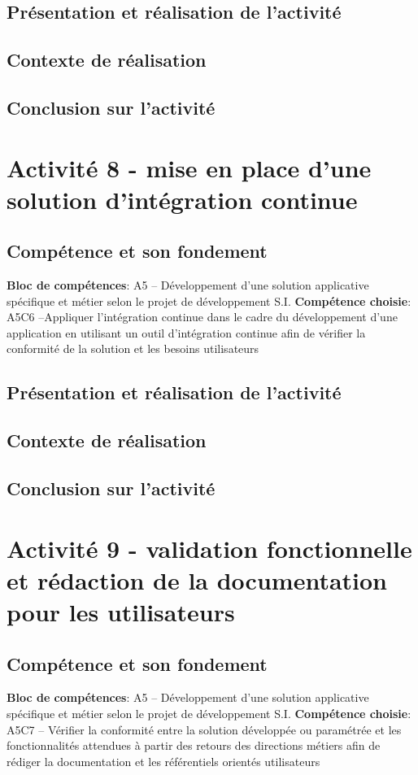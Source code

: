 \documentclass[a4paper, 11pt]{report}
\begin{document}
\subsection{Présentation et réalisation de l'activité}
\subsection{Contexte de réalisation}
\subsection{Conclusion sur l'activité}

\section{Activité 8 - mise en place d’une solution d’intégration continue}
\subsection{Compétence et son fondement}
\textbf{Bloc de compétences}: A5 – Développement d’une solution applicative spécifique et métier selon le projet de développement S.I.
\newline
\textbf{Compétence choisie}: A5C6 –Appliquer l’intégration continue dans le cadre du développement d’une application en utilisant un outil d’intégration continue afin de vérifier la conformité de la solution et les besoins utilisateurs
\subsection{Présentation et réalisation de l'activité}
\subsection{Contexte de réalisation}
\subsection{Conclusion sur l'activité}

\section{Activité 9 - validation fonctionnelle et rédaction de la documentation pour les utilisateurs}
\subsection{Compétence et son fondement}
\textbf{Bloc de compétences}: A5 – Développement d’une solution applicative spécifique et métier selon le projet de développement S.I.
\newline
\textbf{Compétence choisie}: A5C7 – Vérifier la conformité entre la solution développée ou paramétrée et les fonctionnalités attendues à partir des retours des directions métiers afin de rédiger la documentation et les référentiels orientés utilisateurs
\end{document}
